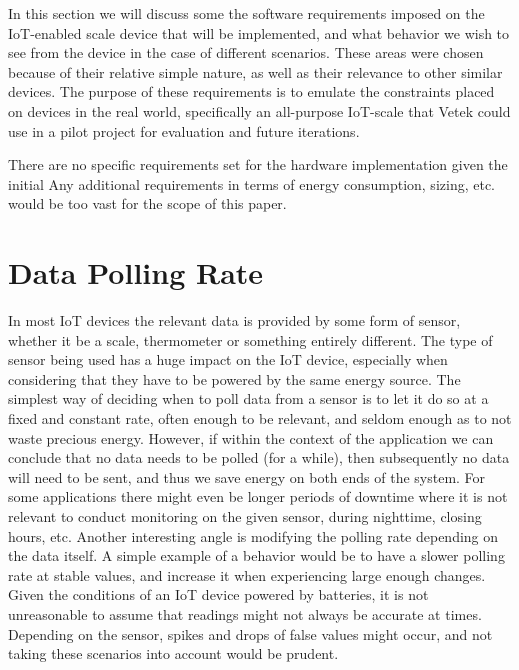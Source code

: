 





In this section we will discuss some the software requirements imposed on the IoT-enabled scale device that will be implemented, and what behavior we wish to see from the device in the case of different scenarios. These areas were chosen because of their relative simple nature, as well as their relevance to other similar devices. The purpose of these requirements is to emulate the constraints placed on devices in the real world, specifically an all-purpose IoT-scale that Vetek could use in a pilot project for evaluation and future iterations. 

There are no specific requirements set for the hardware implementation given the initial  Any additional requirements in terms of energy consumption, sizing, etc. would be too vast for the scope of this paper. 

\section{Data Polling Rate}
In most IoT devices the relevant data is provided by some form of sensor, whether it be a scale, thermometer or something entirely different.\cite{what_is_iot} The type of sensor being used has a huge impact on the IoT device, especially when considering that they have to be powered by the same energy source. The simplest way of deciding when to poll data from a sensor is to let it do so at a fixed and constant rate, often enough to be relevant, and seldom enough as to not waste precious energy. However, if within the context of the application we can conclude that no data needs to be polled (for a while), then subsequently no data will need to be sent, and thus we save energy on both ends of the system. For some applications there might even be longer periods of downtime where it is not relevant to conduct monitoring on the given sensor, \eg during nighttime, closing hours, etc. Another interesting angle is modifying the polling rate depending on the data itself. A simple example of a behavior would be to have a slower polling rate at stable values, and increase it when experiencing large enough changes. Given the conditions of an IoT device powered by batteries, it is not unreasonable to assume that readings might not always be accurate at times. Depending on the sensor, spikes and drops of false values might occur, and not taking these scenarios into account would be prudent. 

